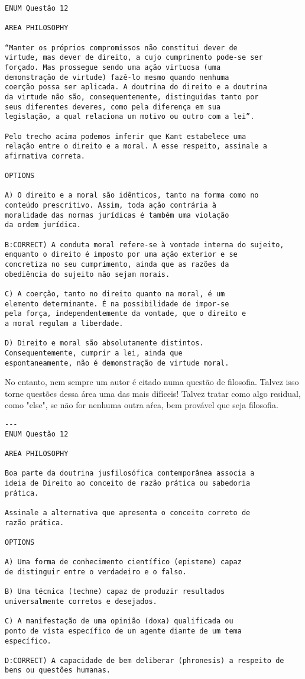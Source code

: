 \documentclass{article}
\begin{document}
\begin{verbatim}
ENUM Questão 12  
 
AREA PHILOSOPHY

“Manter os próprios compromissos não constitui dever de 
virtude, mas dever de direito, a cujo cumprimento pode-se ser 
forçado. Mas prossegue sendo uma ação virtuosa (uma 
demonstração de virtude) fazê-lo mesmo quando nenhuma 
coerção possa ser aplicada. A doutrina do direito e a doutrina 
da virtude não são, consequentemente, distinguidas tanto por 
seus diferentes deveres, como pela diferença em sua 
legislação, a qual relaciona um motivo ou outro com a lei”. 
 
Pelo trecho acima podemos inferir que Kant estabelece uma 
relação entre o direito e a moral. A esse respeito, assinale a 
afirmativa correta.  
 
OPTIONS

A) O direito e a moral são idênticos, tanto na forma como no 
conteúdo prescritivo. Assim, toda ação contrária à 
moralidade das normas jurídicas é também uma violação 
da ordem jurídica. 

B:CORRECT) A conduta moral refere-se à vontade interna do sujeito, 
enquanto o direito é imposto por uma ação exterior e se 
concretiza no seu cumprimento, ainda que as razões da 
obediência do sujeito não sejam morais. 

C) A coerção, tanto no direito quanto na moral, é um 
elemento determinante. É na possibilidade de impor-se 
pela força, independentemente da vontade, que o direito e 
a moral regulam a liberdade. 

D) Direito e moral são absolutamente distintos. 
Consequentemente, cumprir a lei, ainda que 
espontaneamente, não é demonstração de virtude moral. 

\end{verbatim}

No entanto, nem sempre um autor é citado numa questão de filosofia. Talvez isso torne questões dessa área uma das mais difíceis! Talvez tratar como algo residual, como "else", se não for nenhuma outra aŕea, bem provável que seja filosofia.

\begin{verbatim}
---
ENUM Questão 12  
  
AREA PHILOSOPHY
 
Boa parte da doutrina jusfilosófica contemporânea associa a 
ideia de Direito ao conceito de razão prática ou sabedoria 
prática.  
 
Assinale a alternativa que apresenta o conceito correto de 
razão prática. 
 
OPTIONS

A) Uma forma de conhecimento científico (episteme) capaz 
de distinguir entre o verdadeiro e o falso. 

B) Uma técnica (techne) capaz de produzir resultados 
universalmente corretos e desejados. 

C) A manifestação de uma opinião (doxa) qualificada ou 
ponto de vista específico de um agente diante de um tema 
específico. 

D:CORRECT) A capacidade de bem deliberar (phronesis) a respeito de 
bens ou questões humanas. 
\end{verbatim}
\end{document}
